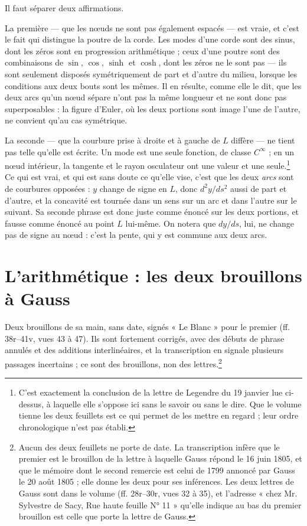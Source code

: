 \documentclass[11pt,a4paper]{article}
\begin{document}
Il faut séparer deux affirmations.

La première — que les nœuds ne sont pas également espacés — est vraie, et
c'est le fait qui distingue la poutre de la corde. Les modes d'une corde sont
des sinus, dont les zéros sont en progression arithmétique ; ceux d'une poutre
sont des combinaisons de $\sin$, $\cos$, $\sinh$ et $\cosh$, dont les zéros ne
le sont pas — ils sont seulement disposés symétriquement de part et d'autre du
milieu, lorsque les conditions aux deux bouts sont les mêmes. Il en résulte, comme elle
le dit, que les deux arcs qu'un nœud sépare n'ont pas la même longueur et ne
sont donc pas superposables : la figure d'Euler, où les deux portions sont
image l'une de l'autre, ne convient qu'au cas symétrique.

La seconde — que la courbure prise à droite et à gauche de $L$ diffère — ne
tient pas telle qu'elle est écrite. Un mode est une seule fonction, de classe
$C^{\infty}$ ; en un nœud intérieur, la tangente et le rayon osculateur ont
une valeur et une seule.\footnote{C'est exactement la conclusion de la lettre
de Legendre du 19 janvier lue ci-dessus, à laquelle elle s'oppose ici sans le
savoir ou sans le dire. Que le volume tienne les deux feuillets est ce qui
permet de les mettre en regard ; leur ordre chronologique n'est pas établi.}
Ce qui est vrai, et qui est sans doute ce qu'elle vise, c'est que les deux
\emph{arcs} sont de courbures opposées : $y$ change de signe en $L$, donc
$d^2y/ds^2$ aussi de part et d'autre, et la concavité est tournée dans un sens
sur un arc et dans l'autre sur le suivant. Sa seconde phrase est donc juste
comme énoncé sur les deux portions, et fausse comme énoncé au point $L$
lui-même. On notera que $dy/ds$, lui, ne change pas de signe au nœud : c'est
la pente, qui y est commune aux deux arcs.

\section*{L'arithmétique : les deux brouillons à Gauss}

Deux brouillons de sa main, sans date, signés « Le Blanc » pour le premier
(ff. 38r–41v, vues 43 à 47). Ils sont fortement corrigés, avec des débuts de
phrase annulés et des additions interlinéaires, et la transcription en
signale plusieurs passages incertains ; ce sont des brouillons, non des
lettres.\footnote{Aucun des deux feuillets ne porte de date. La transcription
infère que le premier est le brouillon de la lettre à laquelle Gauss répond le
16 juin 1805, et que le mémoire dont le second remercie est celui de 1799
annoncé par Gauss le 20 août 1805 ; elle donne les deux pour ses inférences.
Les deux lettres de Gauss sont dans le volume (ff. 28r–30r, vues 32 à 35), et
l'adresse « chez Mr. Sylvestre de Sacy, Rue haute feuille N° 11 » qu'elle
indique au bas du premier brouillon est celle que porte la lettre de Gauss.}
\end{document}
